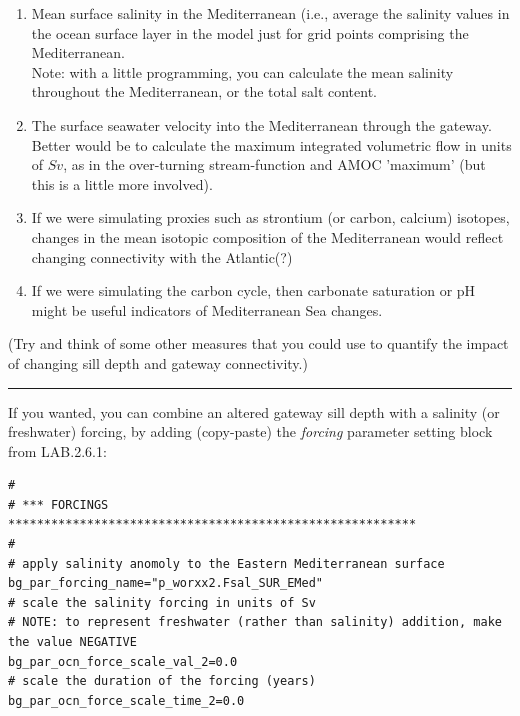 \begin{enumerate}[noitemsep]
\setlength{\itemindent}{.0in}
\vspace{1mm}
\item Mean surface salinity in the Mediterranean (i.e., average the salinity values in the ocean surface layer in the model just for grid points comprising the Mediterranean.
\\Note: with a little programming, you can calculate the mean salinity throughout the Mediterranean, or the total salt content.
\vspace{1mm}
\item The surface seawater velocity into the Mediterranean through the gateway.
\\Better would be to calculate the maximum integrated volumetric flow in units of $Sv$, as in the over-turning stream-function and AMOC 'maximum' (but this is a little more involved).
\vspace{1mm}
\item If we were simulating proxies such as strontium (or carbon, calcium) isotopes, changes in the mean isotopic composition of the Mediterranean would reflect changing connectivity with the Atlantic(?)
\vspace{1mm}
\item If we were simulating the carbon cycle, then carbonate saturation or pH might be useful indicators of Mediterranean Sea changes.
\end{enumerate}

(Try and think of some other measures that you could use to quantify the impact of changing sill depth and gateway connectivity.)

\vspace{1mm}\noindent\rule{4cm}{0.5pt}\vspace{2mm}

\newpage

\noindent If you wanted, you can combine an altered gateway sill depth with a salinity (or freshwater) forcing, by adding (copy-paste) the \textit{forcing} parameter setting block from \textsf{\footnotesize LAB.2.6.1}:

\vspace{-2mm}\footnotesize\begin{verbatim}
#
# *** FORCINGS *********************************************************
#
# apply salinity anomoly to the Eastern Mediterranean surface
bg_par_forcing_name="p_worxx2.Fsal_SUR_EMed"
# scale the salinity forcing in units of Sv
# NOTE: to represent freshwater (rather than salinity) addition, make the value NEGATIVE
bg_par_ocn_force_scale_val_2=0.0
# scale the duration of the forcing (years)
bg_par_ocn_force_scale_time_2=0.0
\end{verbatim}\normalsize\vspace{-2mm}


